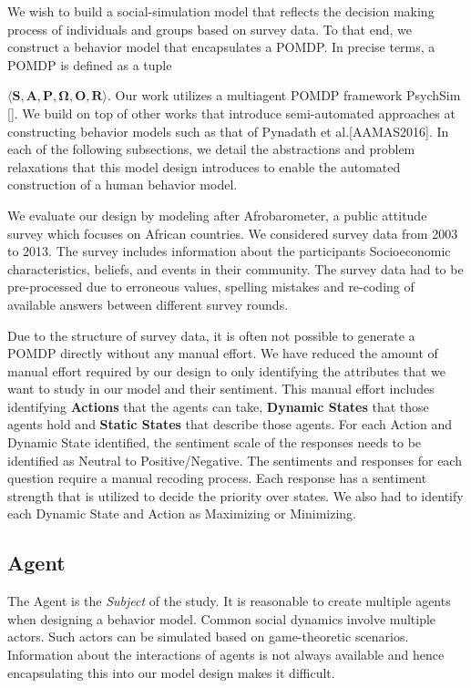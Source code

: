 We wish to build a social-simulation model that reflects the decision making process of individuals and groups based on survey data. To that end, we construct a behavior model that encapsulates a POMDP. In precise terms, a POMDP is defined as a tuple {$ \mathbf{\langle S, A, P, \Omega, O, R \rangle }$. Our work utilizes a multiagent POMDP framework PsychSim []. We build on top of other works that introduce semi-automated approaches at constructing behavior models such as that of Pynadath et al.[AAMAS2016]. In each of the following subsections, we detail the abstractions and problem relaxations that this model design introduces to enable the automated construction of a human behavior model.

We evaluate our design by modeling after Afrobarometer, a public attitude survey which focuses on African countries. We considered survey data from 2003 to 2013. The survey includes information about the participants Socioeconomic characteristics, beliefs, and  events in their community. The survey data had to be pre-processed due to erroneous values, spelling mistakes and re-coding of available answers between different survey rounds.

Due to the structure of survey data, it is often not possible to generate a POMDP directly without any manual effort. We have reduced the amount of manual effort required by our design to only identifying the attributes that we want to study in our model and their sentiment. This manual effort includes identifying \textbf{Actions} that the agents can take, \textbf{Dynamic States} that those agents hold and \textbf{Static States} that describe those agents. For each Action and Dynamic State identified, the sentiment scale of the responses needs to be identified as Neutral to Positive/Negative. The sentiments and responses for each question require a manual recoding process. Each response has a sentiment strength that is utilized to decide the priority over states. We also had to identify  each Dynamic State and Action as Maximizing or Minimizing. 

\subsection{Agent}

The Agent is the \textit{Subject} of the study. It is reasonable to create multiple agents when designing a behavior model. Common social dynamics involve multiple actors. Such actors can be simulated based on game-theoretic scenarios. Information about the interactions of agents is not always available and hence encapsulating this into our model design makes it difficult.

}
